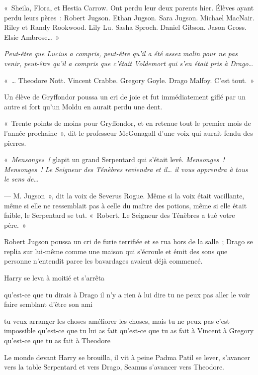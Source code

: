 «~Sheila, Flora, et Hestia Carrow.
Ont perdu leur deux parents hier.
Élèves ayant perdu leurs pères~: Robert Jugson.
Ethan Jugson.
Sara Jugson.
Michael MacNair.
Riley et Randy Rookwood.
Lily Lu.
Sasha Sproch.
Daniel Gibson.
Jason Gross.
Elsie Ambrose…~»

\emph{Peut-être que Lucius a compris, peut-être qu'il a été assez malin pour ne pas venir, peut-être qu'il a compris que c'était Voldemort qui s'en était pris à Drago…}

«~… Theodore Nott.
Vincent Crabbe.
Gregory Goyle.
Drago Malfoy.
C'est tout.~»

Un élève de Gryffondor poussa un cri de joie et fut immédiatement giflé par un autre si fort qu'un Moldu en aurait perdu une dent.

«~Trente points de moins pour Gryffondor, et en retenue tout le premier mois de l'année prochaine~», dit le professeur McGonagall d'une voix qui aurait fendu des pierres.

«~\emph{Mensonges~!} glapit un grand Serpentard qui s'était levé.
\emph{Mensonges~!
Mensonges~!
Le Seigneur des Ténèbres reviendra et il… il vous apprendra à tous le sens de…}

--- M. Jugson~», dit la voix de Severus Rogue.
Même si la voix était vacillante, même si elle ne ressemblait pas à celle du maître des potions, même si elle était faible, le Serpentard se tut.
«~Robert.
Le Seigneur des Ténèbres a tué votre père.~»

Robert Jugson poussa un cri de furie terrifiée et se rua hors de la salle~; Drago se replia sur lui-même comme une maison qui s'écroule et émit des sons que personne n'entendit parce les bavardages avaient déjà commencé.

Harry se leva à moitié et s'arrêta

qu'est-ce que tu dirais à Drago il n'y a rien à lui dire tu ne peux pas aller le voir faire semblant d'être son ami

tu veux arranger les choses améliorer les choses, mais tu ne peux pas c'est impossible qu'est-ce que tu lui as fait qu'est-ce que tu as fait à Vincent à Gregory qu'est-ce que tu as fait à Theodore

Le monde devant Harry se brouilla, il vit à peine Padma Patil se lever, s'avancer vers la table Serpentard et vers Drago, Seamus s'avancer vers Theodore.

